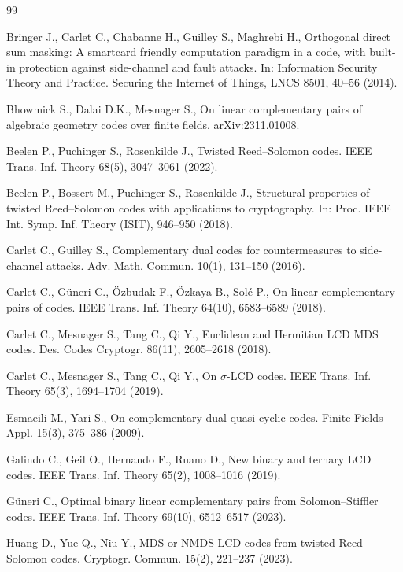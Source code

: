 \documentclass[12pt,draftcls,journal,onecolumn]{IEEEtran}
\begin{document}
\begin{thebibliography}{99}

Bringer J., Carlet C., Chabanne H., Guilley S., Maghrebi H., Orthogonal direct sum masking: A smartcard friendly computation paradigm in a code, with built-in protection against side-channel and fault attacks. In: Information Security Theory and Practice. Securing the Internet of Things, LNCS 8501, 40--56 (2014).

Bhowmick S., Dalai D.K., Mesnager S., On linear complementary pairs of algebraic geometry codes over finite fields. arXiv:2311.01008.

Beelen P., Puchinger S., Rosenkilde J., Twisted Reed--Solomon codes. IEEE Trans. Inf. Theory 68(5), 3047--3061 (2022).

Beelen P., Bossert M., Puchinger S., Rosenkilde J., Structural properties of twisted Reed--Solomon codes with applications to cryptography. In: Proc. IEEE Int. Symp. Inf. Theory (ISIT), 946--950 (2018).

Carlet C., Guilley S., Complementary dual codes for countermeasures to side-channel attacks. Adv. Math. Commun. 10(1), 131--150 (2016).

Carlet C., G\"uneri C., \"Ozbudak F., \"Ozkaya B., Sol\'e P., On linear complementary pairs of codes. IEEE Trans. Inf. Theory 64(10), 6583--6589 (2018).

Carlet C., Mesnager S., Tang C., Qi Y., Euclidean and Hermitian LCD MDS codes. Des. Codes Cryptogr. 86(11), 2605--2618 (2018).

Carlet C., Mesnager S., Tang C., Qi Y., On $\sigma$-LCD codes. IEEE Trans. Inf. Theory 65(3), 1694--1704 (2019).

Esmaeili M., Yari S., On complementary-dual quasi-cyclic codes. Finite Fields Appl. 15(3), 375--386 (2009).

Galindo C., Geil O., Hernando F., Ruano D., New binary and ternary LCD codes. IEEE Trans. Inf. Theory 65(2), 1008--1016 (2019).

G\"uneri C., Optimal binary linear complementary pairs from Solomon--Stiffler codes. IEEE Trans. Inf. Theory 69(10), 6512--6517 (2023).

Huang D., Yue Q., Niu Y., MDS or NMDS LCD codes from twisted Reed--Solomon codes. Cryptogr. Commun. 15(2), 221--237 (2023).


\end{thebibliography}
\end{document}
